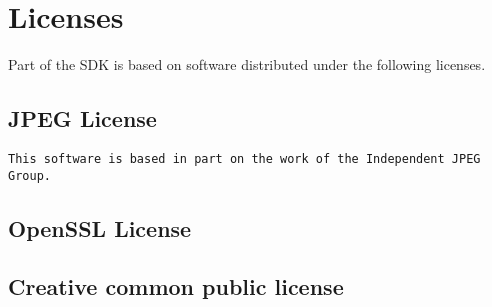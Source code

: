 \chapter{Licenses}
\label{sec:licenses}

Part of the \urbi SDK is based on software distributed under the
following licenses.


\section{JPEG License}

\begin{lstlisting}[language={},basicstyle={\ttfamily\footnotesize}]
This software is based in part on the work of the Independent JPEG Group.
\end{lstlisting}

\section{OpenSSL License}



\section{Creative common public license}




